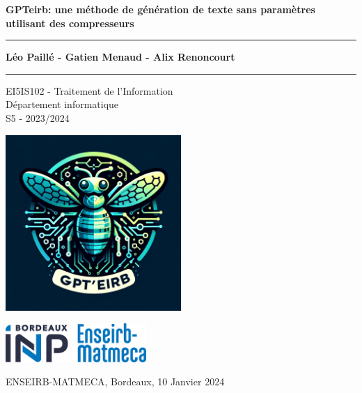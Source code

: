 \documentclass[12pt]{article}
\begin{document}
\begin{titlepage}
    \begin{center}
        \vspace*{1cm}
            
        \Huge
        \textbf{GPTeirb: une méthode de génération de texte sans paramètres utilisant des compresseurs}
            
        \vspace{1.2cm}
        \Large
            
        
        \hrule
        \vspace{0.5cm}
        \textbf{Léo Paillé - Gatien Menaud - Alix Renoncourt}
        \vspace{0.5cm}
        \hrule
            
        \vspace{1cm}

        \large
        EI5IS102 - Traitement de l’Information\\
        Département informatique\\
        S5 - 2023/2024

        \vspace{1cm}

        \includegraphics[width=0.5\textwidth]{./assets/logo.png}
        \vfill
        
        \vspace{0.5cm}
            
        \includegraphics[width=0.4\textwidth]{./assets/Logo_enseirb.png}
        
    \end{center}
    
        \small
        ENSEIRB-MATMECA, Bordeaux, 10 Janvier 2024
        \normalsize
            
\end{titlepage}
\end{document}

